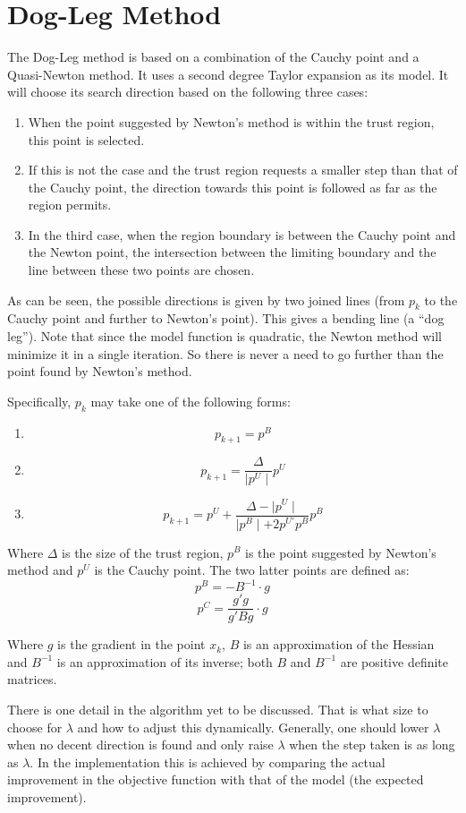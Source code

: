 \documentclass[10pt,oneside,a4paper,final,english]{memoir}
\begin{document}
\section{Dog-Leg Method}
The Dog-Leg method is based on a combination of the Cauchy point and a
Quasi-Newton method. It uses a second degree Taylor expansion as its
model. It will choose its search direction based on the following
three cases:
\begin{enumerate}
\item When the point suggested by Newton's method is within the trust
  region, this point is selected.
\item If this is not the case and the trust region requests a smaller
  step than that of the Cauchy point, the direction towards this point
  is followed as far as the region permits.
\item In the third case, when the region boundary is between the
  Cauchy point and the Newton point, the intersection between the
  limiting boundary and the line between these two points are chosen.
\end{enumerate}

As can be seen, the possible directions is given by two joined lines
(from $p_k$ to the Cauchy point and further to Newton's point). This
gives a bending line (a ``dog leg''). Note that since the model
function is quadratic, the Newton method will minimize it in a single
iteration. So there is never a need to go further than the point found
by Newton's method.

Specifically, $p_k$ may take one of the following forms:
\begin{enumerate}
\item \[ p_{k+1} = p^B \]
\item \[ p_{k+1} = \frac{\Delta}{\mid p^U\mid}  p^U \]
\item \[ p_{k+1} = p^U + \frac{\Delta - \mid p^U\mid}{
    \mid p^B\mid + 2p^{U\prime} p^B} p^B \]
\end{enumerate}

Where $\Delta$ is the size of the trust region, $p^B$ is the point
suggested by Newton's method and $p^U$ is the Cauchy point. The two
latter points are defined as:
\[ p^B = -B^{-1} \cdot g \]
\[ p^C = \frac{g' g}{g'Bg} \cdot g \]

Where $g$ is the gradient in the point $x_k$, $B$ is an approximation
of the Hessian and $B^{-1}$ is an approximation of its inverse; both
$B$ and $B^{-1}$ are positive definite matrices.

There is one detail in the algorithm yet to be discussed. That is what
size to choose for $\lambda$ and how to adjust this
dynamically. Generally, one should lower $\lambda$ when no decent
direction is found and only raise $\lambda$ when the step taken is as
long as $\lambda$. In the implementation this is achieved by comparing
the actual improvement in the objective function with that of the
model (the expected improvement).
\end{document}
